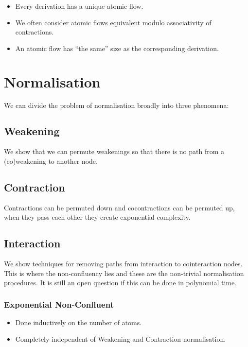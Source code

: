 \documentclass[12pt]{article}
\begin{document}
\begin{itemize}
\item Every derivation has a unique atomic flow.
\item We often consider atomic flows equivalent modulo associativity of contractions.
\item An atomic flow has ``the same'' size as the corresponding derivation.
\end{itemize}

\section{Normalisation}

We can divide the problem of normalisation broadly into three phenomena:

\subsection{Weakening}

We show that we can permute weakenings so that there is no path from a (co)weakening to another node.

\subsection{Contraction}

Contractions can be permuted down and cocontractions can be permuted up, when they pass each other they create exponential complexity.

\subsection{Interaction}

We show techniques for removing paths from interaction to cointeraction nodes. This is where the non-confluency lies and these are the non-trivial normalisation procedures. It is still an open question if this can be done in polynomial time.

\subsubsection{Exponential Non-Confluent}

\begin{itemize}
\item Done inductively on the number of atoms.
\item Completely independent of Weakening and Contraction normalisation.
\end{itemize}
\end{document}
